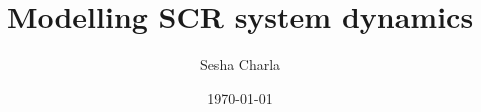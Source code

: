 \documentclass[letterpaper, 11pt]{article}
\title{Modelling SCR system dynamics}
\author{Sesha Charla}
\date{\today}
\begin{document}
\maketitle
\tableofcontents


\newpage


\newpage

\newpage

% 
% 
% 
% 
% 
% 
% 
% 
% 
\newpage
\nocite{}


\end{document}
